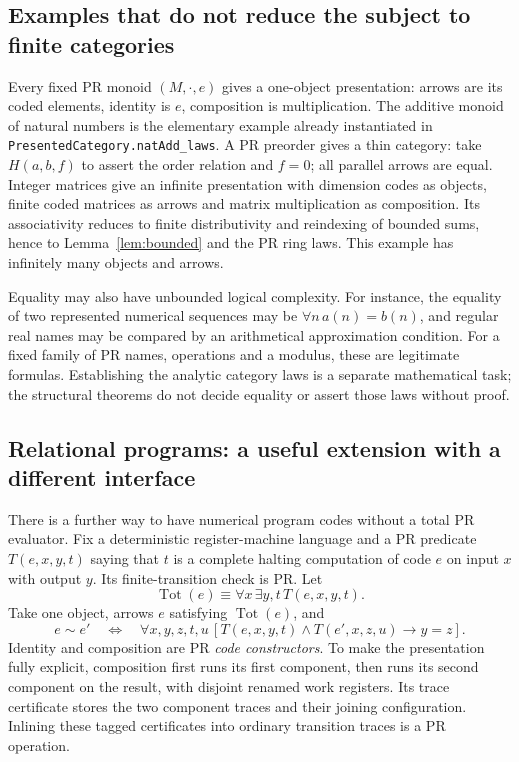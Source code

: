 \subsection{Examples that do not reduce the subject to finite categories}
Every fixed PR monoid $(M,\cdot,e)$ gives a one-object presentation: arrows
are its coded elements, identity is $e$, composition is multiplication.
The additive monoid of natural numbers is the elementary example already
instantiated in \texttt{PresentedCategory.natAdd\_laws}.
A PR preorder gives a thin category: take $H(a,b,f)$ to assert the order
relation and $f=0$; all parallel arrows are equal.
Integer matrices give an infinite presentation with dimension codes as
objects, finite coded matrices as arrows and matrix multiplication as
composition. Its associativity reduces to finite distributivity and
reindexing of bounded sums, hence to Lemma~\ref{lem:bounded} and the PR
ring laws. This example has infinitely many objects and arrows.

Equality may also have unbounded logical complexity. For instance,
the equality of two represented numerical sequences may be
$\forall n\,a(n)=b(n)$, and regular real names may be compared by
an arithmetical approximation condition. For a fixed family of PR names,
operations and a modulus, these are legitimate formulas. Establishing
the analytic category laws is a separate mathematical task; the structural
theorems do not decide equality or assert those laws without proof.

\subsection{Relational programs: a useful extension with a different interface}
There is a further way to have numerical program codes without a total
PR evaluator. Fix a deterministic register-machine language and a PR
predicate $T(e,x,y,t)$ saying that $t$ is a complete halting computation
of code $e$ on input $x$ with output $y$. Its finite-transition check is
PR. Let
\[
 \operatorname{Tot}(e)\equiv\forall x\,\exists y,t\,T(e,x,y,t).
\]
Take one object, arrows $e$ satisfying $\operatorname{Tot}(e)$, and
\[
 e\sim e'\quad\Longleftrightarrow\quad
 \forall x,y,z,t,u\,[T(e,x,y,t)\wedge T(e',x,z,u)\to y=z].       \tag{R}
\]
Identity and composition are PR \emph{code constructors}. To make the
presentation fully explicit, composition first runs its first component,
then runs its second component on the result, with disjoint renamed
work registers. Its trace certificate stores the two component traces
and their joining configuration. Inlining these tagged certificates into
ordinary transition traces is a PR operation.


